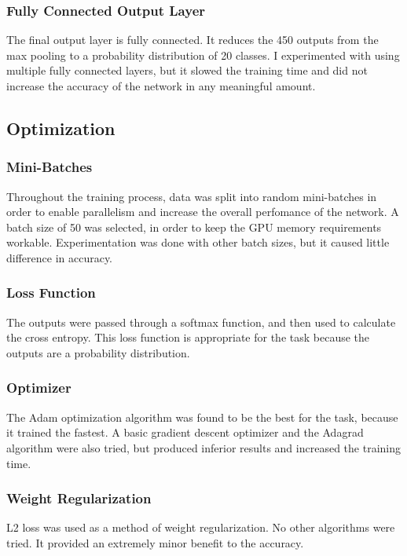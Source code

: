 \documentclass{article}
\begin{document}
\subsubsection{Fully Connected Output Layer}
The final output layer is fully connected. It reduces the 450 outputs from the max pooling to a probability distribution of 20 classes.
I experimented with using multiple fully connected layers, but it slowed the training time and did not increase the accuracy of the network
in any meaningful amount.

\subsection{Optimization}

\subsubsection{Mini-Batches}
Throughout the training process, data was split into random mini-batches in order to enable parallelism and increase the overall perfomance of
the network. A batch size of 50 was selected, in order to keep the GPU memory requirements workable. Experimentation was done with other batch
sizes, but it caused little difference in accuracy.

\subsubsection{Loss Function}
The outputs were passed through a softmax function, and then used to calculate the cross entropy. This loss function is appropriate for the
task because the outputs are a probability distribution.

\subsubsection{Optimizer}
The Adam optimization algorithm was found to be the best for the task, because it trained the fastest. A basic gradient descent optimizer and the Adagrad
algorithm were also tried, but produced inferior results and increased the training time.

\subsubsection{Weight Regularization}
L2 loss was used as a method of weight regularization. No other algorithms were tried. It provided an extremely minor benefit to the accuracy.
\end{document}
